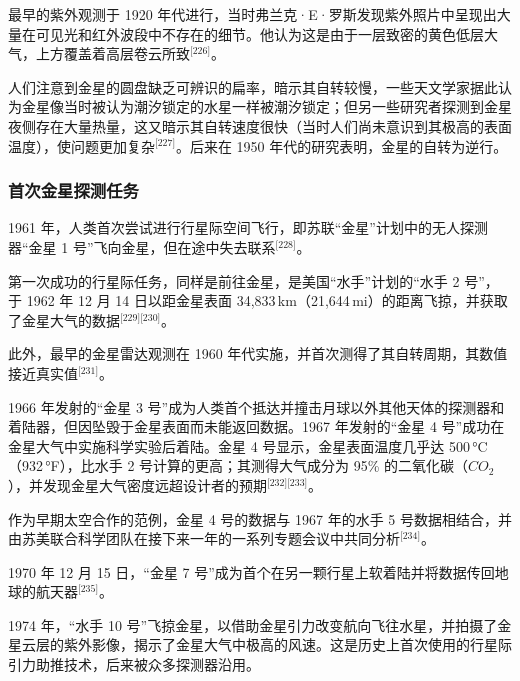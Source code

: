 最早的紫外观测于 1920 年代进行，当时弗兰克·E·罗斯发现紫外照片中呈现出大量在可见光和红外波段中不存在的细节。他认为这是由于一层致密的黄色低层大气，上方覆盖着高层卷云所致\(^\text{[226]}\)。

人们注意到金星的圆盘缺乏可辨识的扁率，暗示其自转较慢，一些天文学家据此认为金星像当时被认为潮汐锁定的水星一样被潮汐锁定；但另一些研究者探测到金星夜侧存在大量热量，这又暗示其自转速度很快（当时人们尚未意识到其极高的表面温度），使问题更加复杂\(^\text{[227]}\)。后来在 1950 年代的研究表明，金星的自转为逆行。
\subsubsection{首次金星探测任务}
1961 年，人类首次尝试进行行星际空间飞行，即苏联“金星”计划中的无人探测器“金星 1 号”飞向金星，但在途中失去联系\(^\text{[228]}\)。

第一次成功的行星际任务，同样是前往金星，是美国“水手”计划的“水手 2 号”，于 1962 年 12 月 14 日以距金星表面 34,833\,km（21,644\,mi）的距离飞掠，并获取了金星大气的数据\(^\text{[229][230]}\)。

此外，最早的金星雷达观测在 1960 年代实施，并首次测得了其自转周期，其数值接近真实值\(^\text{[231]}\)。

1966 年发射的“金星 3 号”成为人类首个抵达并撞击月球以外其他天体的探测器和着陆器，但因坠毁于金星表面而未能返回数据。1967 年发射的“金星 4 号”成功在金星大气中实施科学实验后着陆。金星 4 号显示，金星表面温度几乎达 500\,°C（932\,°F），比水手 2 号计算的更高；其测得大气成分为 95\% 的二氧化碳（$CO_{2}$），并发现金星大气密度远超设计者的预期\(^\text{[232][233]}\)。

作为早期太空合作的范例，金星 4 号的数据与 1967 年的水手 5 号数据相结合，并由苏美联合科学团队在接下来一年的一系列专题会议中共同分析\(^\text{[234]}\)。

1970 年 12 月 15 日，“金星 7 号”成为首个在另一颗行星上软着陆并将数据传回地球的航天器\(^\text{[235]}\)。

1974 年，“水手 10 号”飞掠金星，以借助金星引力改变航向飞往水星，并拍摄了金星云层的紫外影像，揭示了金星大气中极高的风速。这是历史上首次使用的行星际引力助推技术，后来被众多探测器沿用。

